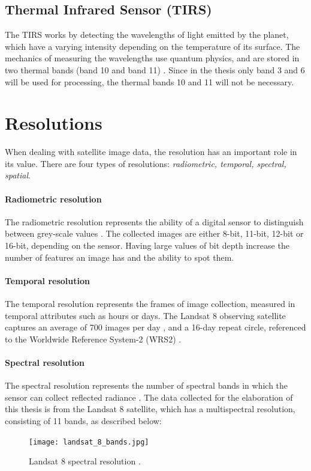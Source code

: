 \documentclass[12pt, a4paper]{report}
\begin{document}
	\subsection{Thermal Infrared Sensor (TIRS)}
	The TIRS works by detecting the wavelengths of light emitted by the planet, which have a varying intensity depending on the temperature of its surface. The mechanics of measuring the wavelengths use quantum physics, and are stored in two thermal bands (band 10 and band 11) \cite{tirs}. Since in the thesis only band 3 and 6 will be used for processing, the thermal bands 10 and 11 will not be necessary.
	
	\section{Resolutions}
	When dealing with satellite image data, the resolution has an important role in its value. There are four types of resolutions: \textit{radiometric, temporal, spectral, spatial}.
	\paragraph{Radiometric resolution}
	The radiometric resolution represents the ability of a digital sensor to distinguish between grey-scale values \cite{radiometric}. The collected images are either 8-bit, 11-bit, 12-bit or 16-bit, depending on the sensor. Having large values of bit depth increase the number of features an image has and the ability to spot them. 
	
	\paragraph{Temporal resolution}
	The temporal resolution represents the frames of image collection, measured in temporal attributes such as hours or days. The Landsat 8 observing satellite captures an average of 700 images per day \cite{temporal}, and a 16-day repeat circle, referenced to the Worldwide Reference System-2 (WRS2) \cite{landsat_satellite}.
	\vskip 0.2cm
	
	\paragraph{Spectral resolution}
	The spectral resolution represents the number of spectral bands in which the sensor can collect reflected radiance \cite{spectral} \cite{band_combination}.
	The data collected for the elaboration of this thesis is from the Landsat 8 satellite, which has a multispectral resolution, consisting of 11 bands, as described below:
	\begin{figure}[ht]
		\centering
		\texttt{[image: landsat\_8\_bands.jpg]}
		\caption{Landsat 8 spectral resolution \cite{landsat_resolution}.}
		\label{fig:landsat8_bands}
	\end{figure}
	\vskip 0.2cm
	
\end{document}
